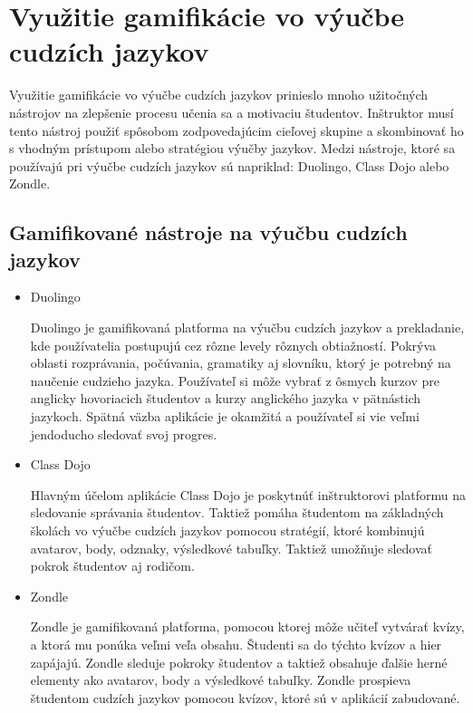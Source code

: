 \documentclass[10pt,oneside,slovak,a4paper]{article}
\begin{document}
\section{Využitie gamifikácie vo výučbe cudzích jazykov} \label{use}
Využitie gamifikácie vo výučbe cudzích jazykov prinieslo mnoho užitočných nástrojov na zlepšenie procesu učenia sa a motivaciu študentov. Inštruktor musí tento nástroj použiť spôsobom zodpovedajúcim cieľovej skupine a skombinovať ho s vhodným prístupom alebo stratégiou výučby jazykov. Medzi nástroje, ktoré sa používajú pri výučbe cudzích jazykov sú napriklad: Duolingo, Class Dojo alebo Zondle. ~\cite{flores2015using}
\subsection{Gamifikované nástroje na výučbu cudzích jazykov}
\begin{itemize}
\item Duolingo \label{Duolingo}

Duolingo je gamifikovaná platforma na výučbu cudzích jazykov a prekladanie, kde používatelia postupujú cez rôzne levely rôznych obtiažností. Pokrýva oblasti rozprávania, počúvania, gramatiky aj slovníku, ktorý je potrebný na naučenie cudzieho jazyka. Používateľ si môže vybrať z ôsmych kurzov pre anglicky hovoriacich študentov a kurzy anglického jazyka v pätnástich jazykoch. Spätná väzba aplikácie je okamžitá a používateľ si vie veľmi jendoducho sledovať svoj progres. ~\cite{flores2015using}

\item Class Dojo

Hlavným účelom aplikácie Class Dojo je poskytnúť inštruktorovi platformu na sledovanie správania študentov. Taktiež pomáha študentom na základných školách vo výučbe cudzích jazykov pomocou stratégií, ktoré kombinujú avatarov, body, odznaky, výsledkové tabuľky. Taktiež umožňuje sledovať pokrok študentov aj rodičom. ~\cite{flores2015using}

\item Zondle

Zondle je gamifikovaná platforma, pomocou ktorej môže učiteľ vytvárať kvízy, a ktorá mu ponúka veľmi veľa obsahu. Študenti sa do týchto kvízov a hier zapájajú. Zondle sleduje pokroky študentov a taktiež obsahuje ďalšie herné elementy ako avatarov, body a výsledkové tabuľky. Zondle prospieva študentom cudzích jazykov pomocou kvízov, ktoré sú v aplikácií zabudované. ~\cite{flores2015using}
\end{itemize}
\end{document}
